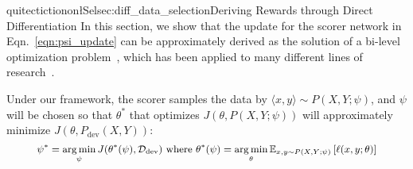 \subse quitectictionon{\l {} Sel{sec:diff_data_selection}Deriving Rewards through Direct Differentiation}
In this section, we show that the update for the scorer network in Eqn.~\ref{eqn:psi_update} can be approximately derived as the solution of a bi-level optimization problem~\citep{bilevel_optim}, which has been applied to many different lines of research~\citep{hyper_grad,darts,learn_reweight}. 

Under our framework, the scorer samples the data by $\langle x, y \rangle \sim P(X, Y; \psi)$, and $\psi$ will be chosen so that $\theta^*$ that optimizes $J(\theta, P(X, Y;\psi))$ will approximately minimize $J(\theta, P_\text{dev}(X,Y))$: 
\begin{equation}
  \label{eqn:psi_theta_argmin}
   \small
  \begin{aligned}
    \psi^* = \argmin_\psi
  J(\theta^*(\psi), \mathcal{D}_\text{dev}) 
    ~\text{where}~
    \theta^*(\psi) = \argmin_\theta \mathbb{E}_{x, y \sim P(X, Y; \psi)} \left[ \ell(x, y; \theta) \right]
  \end{aligned}
\end{equation}

